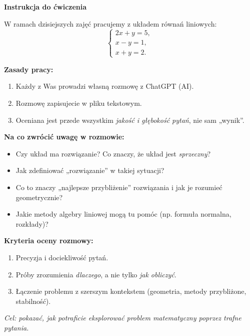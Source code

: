 \documentclass[12pt,a4paper]{article}
\begin{document}
\begin{center}
\Large \textbf{Instrukcja do ćwiczenia}
\end{center}

\bigskip

\noindent
W ramach dzisiejszych zajęć pracujemy z układem równań liniowych:
\[
\begin{cases}
2x + y = 5, \\
x - y = 1, \\
x + y = 2.
\end{cases}
\]

\bigskip

\textbf{Zasady pracy:}
\begin{enumerate}
    \item Każdy z Was prowadzi własną rozmowę z ChatGPT (AI).
    \item Rozmowę zapisujecie w pliku tekstowym.
    \item Oceniana jest przede wszystkim \emph{jakość i głębokość pytań}, nie sam „wynik”.
\end{enumerate}

\bigskip

\textbf{Na co zwrócić uwagę w rozmowie:}
\begin{itemize}
    \item Czy układ ma rozwiązanie? Co znaczy, że układ jest \emph{sprzeczny}?
    \item Jak zdefiniować „rozwiązanie” w takiej sytuacji?
    \item Co to znaczy „najlepsze przybliżenie” rozwiązania i jak je rozumieć geometrycznie?
    \item Jakie metody algebry liniowej mogą tu pomóc (np. formuła normalna, rozkłady)?
\end{itemize}

\bigskip

\textbf{Kryteria oceny rozmowy:}
\begin{enumerate}
    \item Precyzja i dociekliwość pytań.
    \item Próby zrozumienia \emph{dlaczego}, a nie tylko \emph{jak obliczyć}.
    \item Łączenie problemu z szerszym kontekstem (geometria, metody przybliżone, stabilność).
\end{enumerate}

\bigskip

\textit{Cel: pokazać, jak potraficie eksplorować problem matematyczny poprzez trafne pytania.}
\end{document}

